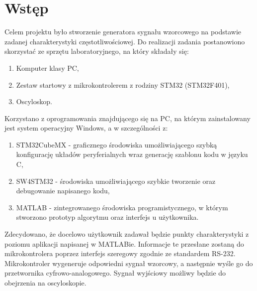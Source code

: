\section{Wstęp}
Celem projektu było stworzenie generatora sygnału wzorcowego na podstawie zadanej charakterystyki częstotliwościowej. Do realizacji zadania postanowiono skorzystać ze sprzętu laboratoryjnego, na który składały się:
\begin{enumerate}
\item Komputer klasy PC,
\item Zestaw startowy z mikrokontrolerem z rodziny STM32 (STM32F401),
\item Oscyloskop.
\end{enumerate}
Korzystano z oprogramowania znajdującego się na PC, na którym zainstalowany jest system operacyjny Windows, a w szczególności z:
\begin{enumerate}
\item STM32CubeMX - graficznego środowiska umożliwiającego szybką konfigurację układów peryferialnych wraz generację szablonu kodu w języku C,
\item SW4STM32 - środowiska umożliwiającego szybkie tworzenie oraz debugowanie napisanego kodu,
\item MATLAB - zintegrowanego środowiska programistycznego, w którym stworzono prototyp algorytmu oraz interfejs u użytkownika.
\end{enumerate}
Zdecydowano, że docelowo użytkownik zadawał będzie punkty charakterystyki z poziomu aplikacji napisanej w MATLABie. Informacje te przesłane zostaną do mikrokontrolera poprzez interfejs szeregowy zgodnie ze standardem RS-232. Mikrokontroler wygeneruje odpowiedni sygnał wzorcowy, a następnie wyśle go do przetwornika cyfrowo-analogowego. Sygnał wyjściowy możliwy będzie do obejrzenia na oscyloskopie.




